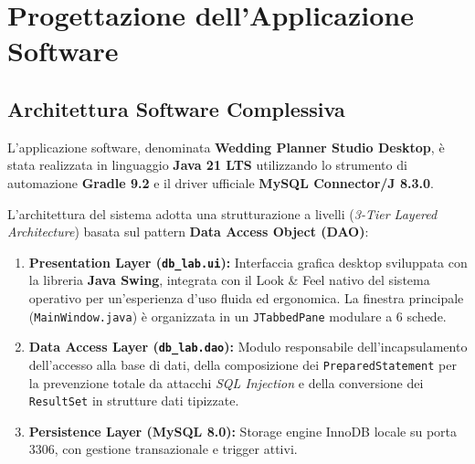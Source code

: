 \chapter{Progettazione dell'Applicazione Software}

\section{Architettura Software Complessiva}
L'applicazione software, denominata \textbf{Wedding Planner Studio Desktop}, è stata realizzata in linguaggio \textbf{Java 21 LTS} utilizzando lo strumento di automazione \textbf{Gradle 9.2} e il driver ufficiale \textbf{MySQL Connector/J 8.3.0}.

L'architettura del sistema adotta una strutturazione a livelli (\textit{3-Tier Layered Architecture}) basata sul pattern \textbf{Data Access Object (DAO)}:

\begin{enumerate}
    \item \textbf{Presentation Layer (\texttt{db\_lab.ui}):} Interfaccia grafica desktop sviluppata con la libreria \textbf{Java Swing}, integrata con il Look \& Feel nativo del sistema operativo per un'esperienza d'uso fluida ed ergonomica. La finestra principale (\texttt{MainWindow.java}) è organizzata in un \texttt{JTabbedPane} modulare a 6 schede.
    \item \textbf{Data Access Layer (\texttt{db\_lab.dao}):} Modulo responsabile dell'incapsulamento dell'accesso alla base di dati, della composizione dei \texttt{PreparedStatement} per la prevenzione totale da attacchi \textit{SQL Injection} e della conversione dei \texttt{ResultSet} in strutture dati tipizzate.
    \item \textbf{Persistence Layer (MySQL 8.0):} Storage engine InnoDB locale su porta 3306, con gestione transazionale e trigger attivi.
\end{enumerate}

